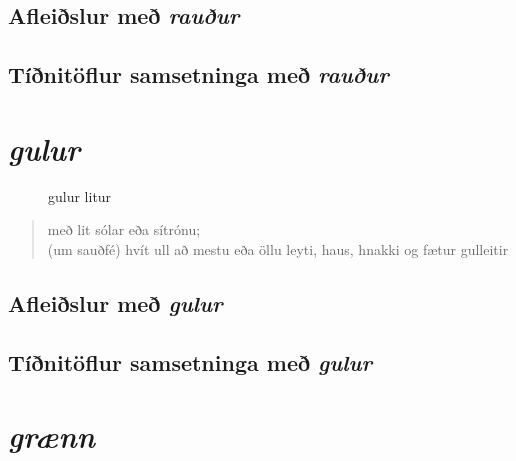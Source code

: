 \documentclass[12pt,b5paper,twosided,openright]{book}
\begin{document}
\section{Afleiðslur með \textit{rauður}}
\label{afl:raudafl}


\section{Tíðnitöflur samsetninga með \textit{rauður}}
\label{tidni:raudtid}


\chapter{\textit{gulur}}
\label{kafli:gulur}

\begin{figure}[H]
\begin{tcolorbox}
	\centering
\end{tcolorbox}
	\caption{gulur litur}
	\label{mynd:gult}
\end{figure}

\begin{quote}
með lit sólar eða sítrónu; \\
(um sauðfé) hvít ull að mestu eða öllu leyti, haus, hnakki og fætur gulleitir
\end{quote}
\clearpage

\section{Afleiðslur með \textit{gulur}}
\label{afl:gulafl}


\section{Tíðnitöflur samsetninga með \textit{gulur}}
\label{tidni:gulur}


\chapter{\textit{grænn}}
\label{kafli:graenn}
\end{document}
